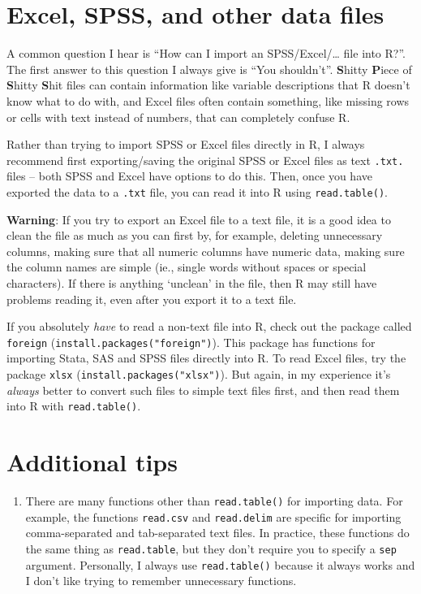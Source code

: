 \documentclass[]{book}
\providecommand{\tightlist}{%
  \setlength{\itemsep}{0pt}\setlength{\parskip}{0pt}}
\theoremstyle{definition}
\theoremstyle{definition}
\theoremstyle{remark}
\begin{document}
\section{Excel, SPSS, and other data
files}\label{excel-spss-and-other-data-files}

A common question I hear is ``How can I import an SPSS/Excel/\ldots{}
file into R?''. The first answer to this question I always give is ``You
shouldn't''. \textbf{S}hitty \textbf{P}iece of \textbf{S}hitty
\textbf{S}hit files can contain information like variable descriptions
that R doesn't know what to do with, and Excel files often contain
something, like missing rows or cells with text instead of numbers, that
can completely confuse R.

Rather than trying to import SPSS or Excel files directly in R, I always
recommend first exporting/saving the original SPSS or Excel files as
text \texttt{.txt.} files -- both SPSS and Excel have options to do
this. Then, once you have exported the data to a \texttt{.txt} file, you
can read it into R using \texttt{read.table()}.

\textbf{Warning}: If you try to export an Excel file to a text file, it
is a good idea to clean the file as much as you can first by, for
example, deleting unnecessary columns, making sure that all numeric
columns have numeric data, making sure the column names are simple (ie.,
single words without spaces or special characters). If there is anything
`unclean' in the file, then R may still have problems reading it, even
after you export it to a text file.

If you absolutely \emph{have} to read a non-text file into R, check out
the package called \texttt{foreign}
(\texttt{install.packages("foreign")}). This package has functions for
importing Stata, SAS and SPSS files directly into R. To read Excel
files, try the package \texttt{xlsx}
(\texttt{install.packages("xlsx")}). But again, in my experience it's
\emph{always} better to convert such files to simple text files first,
and then read them into R with \texttt{read.table()}.

\section{Additional tips}\label{additional-tips}

\begin{enumerate}
\def\labelenumi{\arabic{enumi}.}
\tightlist
\item
  There are many functions other than \texttt{read.table()} for
  importing data. For example, the functions \texttt{read.csv} and
  \texttt{read.delim} are specific for importing comma-separated and
  tab-separated text files. In practice, these functions do the same
  thing as \texttt{read.table}, but they don't require you to specify a
  \texttt{sep} argument. Personally, I always use \texttt{read.table()}
  because it always works and I don't like trying to remember
  unnecessary functions.
\end{enumerate}
\end{document}
